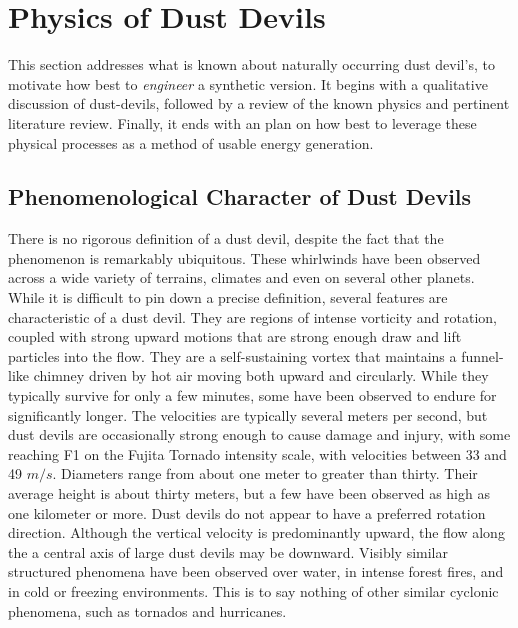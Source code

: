 \section{Physics of Dust Devils}
\label{sec:physics}

This section addresses what is known about naturally occurring dust
devil's, to motivate how best to \textit{engineer} a synthetic version. 
It begins with a qualitative discussion of dust-devils, followed by a
review of the known physics and pertinent literature review. Finally, it
ends with an plan on how best to leverage these physical processes as a
method of usable energy generation.   


\subsection{Phenomenological Character of Dust Devils}


There is no rigorous definition of a dust devil, despite the fact that
the phenomenon is remarkably ubiquitous. These whirlwinds have been
observed across a wide variety of terrains, climates and even on several
other planets\cite{Sinclair1969,Bluestein2004,JGR:JGR13978,JGRE:JGRE1660}. 
While it is difficult to pin down a precise definition, several features 
are characteristic of a dust devil. They are regions of
intense vorticity and rotation, coupled with strong upward motions 
that are strong enough draw and lift particles into the flow.
They are a self-sustaining vortex that maintains a funnel-like
chimney driven by hot air moving both upward and circularly. 
While they typically survive for only a few minutes, some have 
been observed to endure for significantly longer. The velocities are 
typically several meters per second, but
%
%
dust devils are occasionally strong enough to cause damage and injury,
with some reaching F1 on the Fujita Tornado intensity
scale\cite{Edwards_tornadointensity}, with velocities between 33 and 49
$m/s$. 
%
%
Diameters range from about one meter to greater than thirty.  Their
average height is about thirty meters, but a few have been observed 
as high as one kilometer or more. Dust devils do not appear to have a
preferred rotation direction. Although the vertical velocity 
is predominantly upward, the flow along the a central axis of large dust
devils may be downward. 
%
%
Visibly similar structured phenomena have been observed over water, in
intense forest fires, and in cold or freezing environments. 
%
%
This is to say nothing of other similar cyclonic phenomena, such as
tornados and hurricanes. 

